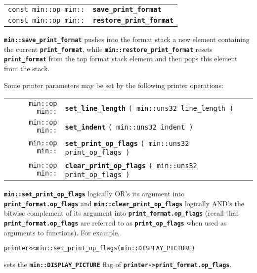\documentclass[12pt]{article}
\makeatletter
\newcommand{\TT}[1]{{\tt \bfseries #1}}
\newcommand{\ttindex}[1]{\index{#1@{\tt #1}}}
\newcommand{\EOL}{\penalty \exhyphenpenalty}
\newenvironment{indpar}[1][0.3in]%
	{\begin{list}{}%
		     {\setlength{\itemsep}{0in}%
		      \setlength{\topsep}{0in}%
		      \setlength{\parsep}{1ex}%
		      \setlength{\labelwidth}{#1}%
		      \setlength{\leftmargin}{#1}%
		      \addtolength{\leftmargin}{\labelsep}}%
	 \item}%
	{\end{list}}
\newcommand{\LABEL}[1]{\label{#1}}
\newcommand{\MINKEY}[1]%
	   {\TT{#1}\ttindex{min::#1}\ttindex{#1}}
\makeatother
\begin{document}
\begin{indpar}[1em]\begin{tabular}{r@{}l}
\verb|const min::op min::|
    & \MINKEY{save\_print\_format}
\LABEL{MIN::SAVE_PRINT_FORMAT} \\
\verb|const min::op min::|
    & \MINKEY{restore\_print\_format}
\LABEL{MIN::RESTORE_PRINT_FORMAT} \\
\end{tabular}\end{indpar}

\TT{min::save\_print\_format}
pushes into the format stack a new element containing
the current \TT{print\_\EOL format}, while
\TT{min::\EOL restore\_\EOL print\_\EOL format}
resets \TT{print\_\EOL format} from the top format stack element and then
pops this element from the stack.

Some printer parameters may be set
by the following printer operations:

\begin{indpar}[1em]\begin{tabular}{r@{}l}
\verb|min::op min::|
    & \MINKEY{set\_\EOL line\_length} \verb|( min::uns32 line_length )|
\LABEL{MIN::SET_LINE_LENGTH} \\
\verb|min::op min::|
    & \MINKEY{set\_\EOL indent} \verb|( min::uns32 indent )|
\LABEL{MIN::SET_INDENT} \\
\verb|min::op min::|
    & \MINKEY{set\_print\_op\_flags} \verb|( min::uns32 print_op_flags )|
\LABEL{MIN::SET_PRINT_OP_FLAGS} \\
\verb|min::op min::|
    & \MINKEY{clear\_print\_op\_flags} \verb|( min::uns32 print_op_flags )|
\LABEL{MIN::CLEAR_PRINT_OP_FLAGS} \\
\end{tabular}\end{indpar}

\TT{min::\EOL set\_\EOL print\_\EOL op\_\EOL flags} logically OR's
its argument into \TT{print\_\EOL format.op\_\EOL flags} and
\TT{min::\EOL clear\_\EOL print\_\EOL op\_\EOL flags} logically AND's
the bitwise complement of its argument into
\TT{print\_\EOL format.op\_\EOL flags}
(recall that \TT{print\_\EOL format.op\_\EOL flags} are referred to as
\TT{print\_\EOL op\_\EOL flags} when used as arguments to functions).
For example, 
\begin{center}
\tt printer<{}<min::set\_print\_op\_flags(min::DISPLAY\_PICTURE)
\end{center}
sets the \TT{min::DISPLAY\_PICTURE} flag of
\TT{printer->\EOL print\_\EOL format.op\_\EOL flags}.
\end{document}
